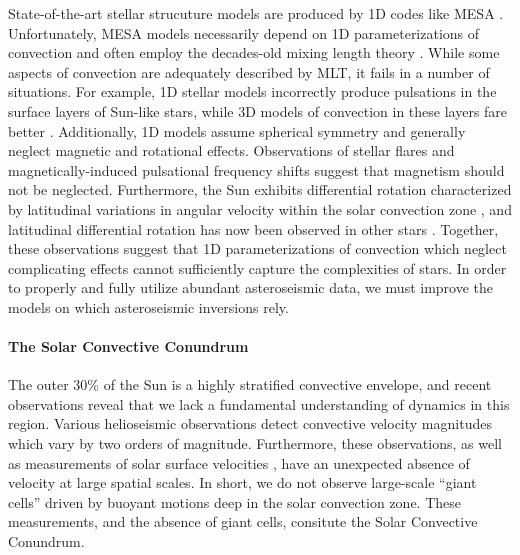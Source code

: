 State-of-the-art stellar strucuture models are produced by 1D codes like MESA \cite{paxton&all2011}.
Unfortunately, MESA models necessarily depend on 1D parameterizations of convection and often employ the decades-old mixing length theory \cite[MLT,][]{bohm-vitense1958}.
While some aspects of convection are adequately described by MLT, it fails in a number of situations.
For example, 1D stellar models incorrectly produce pulsations in the surface layers of Sun-like stars, while 3D models of convection in these layers fare better \cite{jorgensen&weiss2019}.
Additionally, 1D models assume spherical symmetry and generally neglect magnetic and rotational effects.
Observations of stellar flares \cite{kowalski2016} and magnetically-induced pulsational frequency shifts \cite{santos&all2018} suggest that magnetism should not be neglected.
Furthermore, the Sun exhibits differential rotation characterized by latitudinal variations in angular velocity within the solar convection zone \cite{thompson&all1996, schou&all1998}, and latitudinal differential rotation has now been observed in other stars \cite{benomar&all2018}.
Together, these observations suggest that 1D parameterizations of convection which neglect complicating effects cannot sufficiently capture the complexities of stars.
In order to properly and fully utilize abundant asteroseismic data, we must improve the models on which asteroseismic inversions rely.

\paragraph{The Solar Convective Conundrum}
\label{sct:convective_conundrum}
The outer 30\% of the Sun is a highly stratified convective envelope, and recent observations reveal that we lack a fundamental understanding of dynamics in this region.
Various helioseismic observations \cite{hanasoge&all2012, greer&all2015} detect convective velocity magnitudes which vary by two orders of magnitude.
Furthermore, these observations, as well as measurements of solar surface velocities \cite{hathaway&all2015}, have an unexpected absence of velocity at large spatial scales.
In short, we do not observe large-scale ``giant cells'' driven by buoyant motions deep in the solar convection zone.
These measurements, and the absence of giant cells, consitute the Solar Convective Conundrum.

